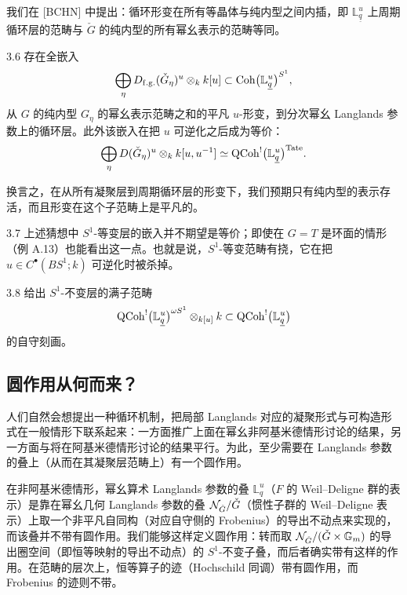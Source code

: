 我们在 [BCHN] 中提出：循环形变在所有等晶体与纯内型之间内插，即 $\mathbb L^u_{\underline q}$ 上周期循环层的范畴与 $\check G$ 的纯内型的所有幂幺表示的范畴等同。

\begin{conj}{3.6}\label{conj:a5-02-1}
存在全嵌入
\[
\bigoplus_\eta D_{\mathrm{f.g.}}(\check G_\eta)^u\otimes_k k[u]\subset\operatorname{Coh}\bigl(\mathbb L^u_{\underline q}\bigr)^{S^1},
\]
从 $G$ 的纯内型 $G_\eta$ 的幂幺表示范畴之和的平凡 $u$-形变，到分次幂幺 Langlands 参数上的循环层。此外该嵌入在把 $u$ 可逆化之后成为等价：
\[
\bigoplus_\eta D(\check G_\eta)^u\otimes_k k[u,u^{-1}]\simeq\operatorname{QCoh}^{!}\bigl(\mathbb L^u_{\underline q}\bigr)^{\mathrm{Tate}}.
\]
\end{conj}

换言之，在从所有凝聚层到周期循环层的形变下，我们预期只有纯内型的表示存活，而且形变在这个子范畴上是平凡的。

\begin{rem}{3.7}\label{rem:a5-02-1}
上述猜想中 $S^1$-等变层的嵌入并不期望是等价；即使在 $G=T$ 是环面的情形（例 A.13）也能看出这一点。也就是说，$S^1$-等变范畴有挠，它在把 $u\in C^\bullet(BS^1;k)$ 可逆化时被杀掉。
\end{rem}

\begin{prob}{3.8}\label{prob:a5-02-1}
给出 $S^1$-不变层的满子范畴
\[
\operatorname{QCoh}^{!}\bigl(\mathbb L^u_{\underline q}\bigr)^{\omega S^1}\otimes_{k[u]}k\subset\operatorname{QCoh}^{!}\bigl(\mathbb L^u_{\underline q}\bigr)
\]
的自守刻画。
\end{prob}

\subsection{圆作用从何而来？}
人们自然会想提出一种循环机制，把局部 Langlands 对应的凝聚形式与可构造形式在一般情形下联系起来：一方面推广上面在幂幺非阿基米德情形讨论的结果，另一方面与将在阿基米德情形讨论的结果平行。为此，至少需要在 Langlands 参数的叠上（从而在其凝聚层范畴上）有一个圆作用。

在非阿基米德情形，幂幺算术 Langlands 参数的叠 $\mathbb L^u_q$（$F$ 的 Weil–Deligne 群的表示）是靠在幂幺几何 Langlands 参数的叠 $\mathcal{N}_{\check G}/\check G$（惯性子群的 Weil–Deligne 表示）上取一个非平凡自同构（对应自守侧的 Frobenius）的导出不动点来实现的，而该叠并不带有圆作用。我们能够这样定义圆作用：转而取 $\mathcal{N}_{\check G}/(\check G\times\mathbb{G}_m)$ 的导出圈空间（即恒等映射的导出不动点）的 $S^1$-不变子叠，而后者确实带有这样的作用。在范畴的层次上，恒等算子的迹（Hochschild 同调）带有圆作用，而 Frobenius 的迹则不带。

